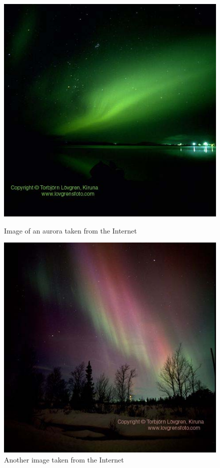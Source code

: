 \documentclass{article}
\begin{document}
\begin{figure}[ht]
\begin{minipage}[b]{0.5\linewidth}
\centering
\includegraphics[scale=1.8]{Figures/awowa1.jpg}
\caption{Image of an aurora taken from the Internet}
\label{fig:Awowa1}
\end{minipage}
\hspace{0.5cm}
\begin{minipage}[b]{0.5\linewidth}
\centering
\includegraphics[scale=1.8]{Figures/awowa2.jpg}
\caption{Another image taken from the Internet}
\label{fig:Awowa2}
\end{minipage}
\end{figure}
\end{document}
